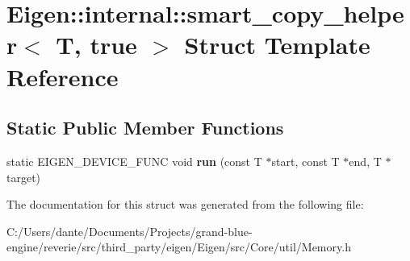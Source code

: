 \hypertarget{struct_eigen_1_1internal_1_1smart__copy__helper_3_01_t_00_01true_01_4}{}\section{Eigen\+::internal\+::smart\+\_\+copy\+\_\+helper$<$ T, true $>$ Struct Template Reference}
\label{struct_eigen_1_1internal_1_1smart__copy__helper_3_01_t_00_01true_01_4}
\subsection*{Static Public Member Functions}
\begin{DoxyCompactItemize}
\item 
\mbox{\label{struct_eigen_1_1internal_1_1smart__copy__helper_3_01_t_00_01true_01_4_a9872c664be2ec0d7493901897b0e1adf}} 
static E\+I\+G\+E\+N\+\_\+\+D\+E\+V\+I\+C\+E\+\_\+\+F\+U\+NC void {\bfseries run} (const T $\ast$start, const T $\ast$end, T $\ast$target)
\end{DoxyCompactItemize}


The documentation for this struct was generated from the following file\+:\begin{DoxyCompactItemize}
\item 
C\+:/\+Users/dante/\+Documents/\+Projects/grand-\/blue-\/engine/reverie/src/third\+\_\+party/eigen/\+Eigen/src/\+Core/util/Memory.\+h\end{DoxyCompactItemize}

